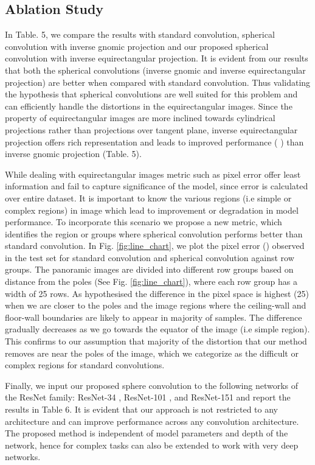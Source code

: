 \documentclass[final]{cvpr}
\begin{document}
\subsection{Ablation Study}\label{subsec:ablation}
In Table. 5, we compare the results with standard convolution, spherical convolution with inverse gnomic projection \cite{coors2018spherenet} and our proposed spherical convolution with inverse equirectangular projection. It is evident from our results that both the spherical convolutions (inverse gnomic and inverse equirectangular projection) are better when compared with standard convolution. Thus validating the hypothesis that spherical convolutions are well suited for this problem and can efficiently handle the distortions in the equirectangular images. Since the property of equirectangular images are more inclined towards cylindrical projections rather than projections over tangent plane, inverse equirectangular projection offers rich representation and leads to improved performance ( ) than inverse gnomic projection (Table. 5).

While dealing with equirectangular images metric such as pixel error offer least information and fail to capture significance of the model, since error is calculated over entire dataset. It is important to know the various regions (i.e simple or complex regions) in image which lead to improvement or degradation in model performance. To incorporate this scenario we propose a new metric, which identifies the region or groups where spherical convolution performs better than standard convolution. In Fig. \ref{fig:line_chart}, we plot the pixel error () observed in the test set for standard convolution and spherical convolution against row groups. The panoramic images are divided into different row groups based on distance from the poles (See Fig. \ref{fig:line_chart}), where each row group has a width of 25 rows.
As hypothesised the difference in the pixel space is highest (25) when we are closer to the poles and the image regions where the ceiling-wall and floor-wall boundaries are likely to appear in majority of samples. The difference gradually decreases as we go towards the equator of the image (i.e simple region). This confirms to our assumption that majority of the distortion that our method removes are near the poles of the image, which we categorize as the difficult or complex regions for standard convolutions.



Finally, we input our proposed sphere convolution to the following networks of the ResNet family: ResNet-34 \cite{he2016deep}, ResNet-101 \cite{he2016deep}, and ResNet-151 \cite{he2016deep} and report the results in Table 6. It is evident that our approach is not restricted to any architecture and can improve performance across any convolution architecture. The proposed method is independent of model parameters and depth of the network, hence for complex tasks can also be extended to work with very deep networks.
\end{document}
